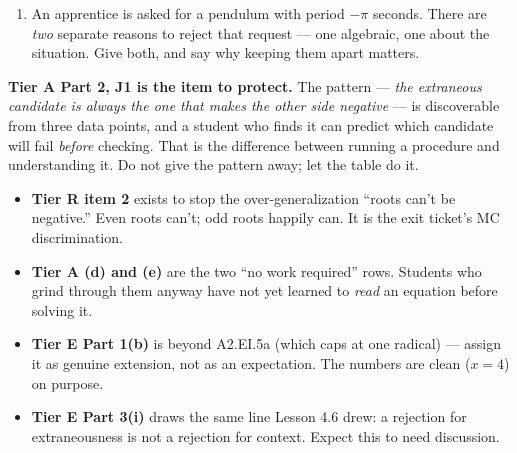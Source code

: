 \documentclass[10pt]{article}
\begin{document}
\begin{tcolorbox}[colback=white, colframe=black!40, title=\textbf{Tier E --- Extension},
    fonttitle=\bfseries, arc=1.5mm, left=3mm, right=3mm, top=2mm, bottom=2mm, breakable]
\begin{enumerate}[label=(\alph*), leftmargin=1.9em, itemsep=6pt, start=7]
        {\small \emph{Work:} $\sqrt{L/32}=\tfrac12 \Rightarrow L/32=\tfrac14 \Rightarrow L=8$.
        (5.2's table: $L=8 \Rightarrow T=\pi$. \checkmark)}

        The period was cut in half. What happened to the length, and which feature of a square root
        graph explains it? 
  \item An apprentice is asked for a pendulum with period $-\pi$ seconds. There are \emph{two}
        separate reasons to reject that request --- one algebraic, one about the situation. Give
        both, and say why keeping them apart matters. 
\end{enumerate}
\end{tcolorbox}

\begin{teachernote}
\small \textbf{Tier A Part 2, J1 is the item to protect.} The pattern --- \emph{the extraneous
candidate is always the one that makes the other side negative} --- is discoverable from three data
points, and a student who finds it can predict which candidate will fail \emph{before} checking.
That is the difference between running a procedure and understanding it. Do not give the pattern
away; let the table do it.
\begin{itemize}[leftmargin=1.3em, nosep]
  \item \textbf{Tier R item 2} exists to stop the over-generalization ``roots can't be negative.''
        Even roots can't; odd roots happily can. It is the exit ticket's MC discrimination.
  \item \textbf{Tier A (d) and (e)} are the two ``no work required'' rows. Students who grind
        through them anyway have not yet learned to \emph{read} an equation before solving it.
  \item \textbf{Tier E Part 1(b)} is beyond A2.EI.5a (which caps at one radical) --- assign it as
        genuine extension, not as an expectation. The numbers are clean ($x=4$) on purpose.
  \item \textbf{Tier E Part 3(i)} draws the same line Lesson 4.6 drew: a rejection for
        extraneousness is not a rejection for context. Expect this to need discussion.
\end{itemize}
\end{teachernote}
\end{document}
